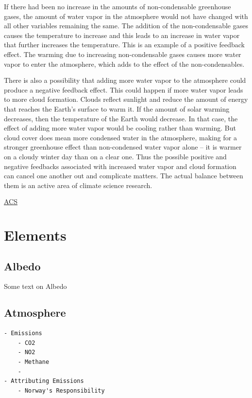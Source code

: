 \documentclass[
]{book}
\begin{document}
If there had been no increase in the amounts of non-condensable greenhouse gases, the amount of water vapor in the atmosphere would not have changed with all other variables remaining the same. The addition of the non-condensable gases causes the temperature to increase and this leads to an increase in water vapor that further increases the temperature. This is an example of a positive feedback effect. The warming due to increasing non-condensable gases causes more water vapor to enter the atmosphere, which adds to the effect of the non-condensables.

There is also a possibility that adding more water vapor to the atmosphere could produce a negative feedback effect. This could happen if more water vapor leads to more cloud formation. Clouds reflect sunlight and reduce the amount of energy that reaches the Earth's surface to warm it. If the amount of solar warming decreases, then the temperature of the Earth would decrease. In that case, the effect of adding more water vapor would be cooling rather than warming. But cloud cover does mean more condensed water in the atmosphere, making for a stronger greenhouse effect than non-condensed water vapor alone -- it is warmer on a cloudy winter day than on a clear one. Thus the possible positive and negative feedbacks associated with increased water vapor and cloud formation can cancel one another out and complicate matters. The actual balance between them is an active area of climate science research.

\href{https://www.acs.org/content/acs/en/climatescience/climatesciencenarratives/its-water-vapor-not-the-co2.html}{ACS}

\hypertarget{part-elements}{%
\part{Elements}\label{part-elements}}

\hypertarget{albedo}{%
\chapter{Albedo}\label{albedo}}

Some text on Albedo

\hypertarget{atmosphere}{%
\chapter{Atmosphere}\label{atmosphere}}

\begin{verbatim}
- Emissions
    - CO2
    - NO2   
    - Methane
    -
- Attributing Emissions
    - Norway's Responsibility
\end{verbatim}
\end{document}
